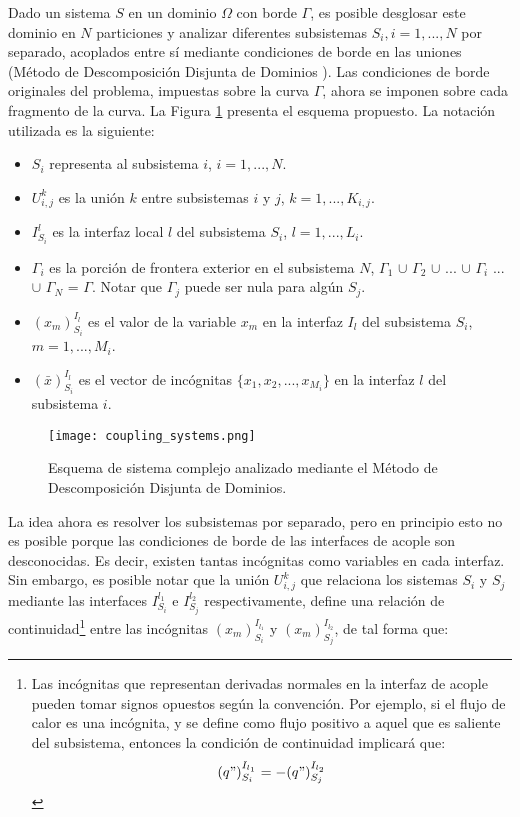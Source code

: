 Dado un sistema $S$ en un dominio $\Omega$ con borde $\Gamma$, es posible desglosar este dominio en $N$ particiones 
y analizar diferentes subsistemas $S_i,i=1,...,N$ por separado, acoplados entre sí mediante condiciones de borde en las uniones
(Método de Descomposición Disjunta de Dominios \cite{ddmethod}).
Las condiciones de borde originales del problema, impuestas sobre la curva $\Gamma$,
ahora se imponen sobre cada fragmento de la curva.
La Figura \ref{esquema-acoplamiento} presenta el esquema propuesto.
La notación utilizada es la siguiente:
\begin{itemize}
\item $S_i$ representa al subsistema $i$, $i=1,...,N$.
\item $U_{i,j}^k$ es la unión $k$ entre subsistemas $i$ y $j$, $k=1,...,K_{i,j}$.
\item $I_{S_i}^{l}$ es la interfaz local $l$ del subsistema $S_i$, $l=1,...,L_i$.
\item $\Gamma_i$ es la porción de frontera exterior en el subsistema $N$,
 $\Gamma_1$ $\cup$ $\Gamma_2$ $\cup$ ... $\cup$ $\Gamma_i$ ...  $\cup$ $\Gamma_N$ = $\Gamma$.
 Notar que $\Gamma_j$ puede ser nula para algún $S_j$.
\item ${(x_m)_{S_i}^{I_l}}$ es el valor de la variable $x_m$ en la interfaz ${I_l}$ del subsistema ${S_i}$, $m=1,...,M_i$.
\item ${(\bar{x})_{S_i}^{I_l}}$ es el vector de incógnitas $\{x_1,x_2,...,x_{M_i}\}$ en la interfaz ${l}$ del subsistema ${i}$.
\end{itemize}

\begin{figure}[ht]
\centering{}\texttt{[image: coupling\_systems.png]}
\caption[Esquema de sistema complejo analizado mediante el Método de Descomposición Disjunta de Dominios]
{Esquema de sistema complejo analizado mediante el Método de Descomposición Disjunta de Dominios.} 
\label{esquema-acoplamiento} 
\end{figure}
La idea ahora es resolver los subsistemas por separado, pero en principio esto no es posible porque las condiciones de borde de las interfaces de acople son desconocidas.
Es decir, existen tantas incógnitas como variables en cada interfaz.
Sin embargo, es posible notar que la unión $U_{i,j}^k$ que relaciona los sistemas $S_{i}$ y $S_{j}$ 
mediante las interfaces $I_{S_{i}}^{l_1}$ e $I_{S_{j}}^{l_2}$ respectivamente, 
define una relación de continuidad\footnote{
Las incógnitas que representan derivadas normales en la interfaz de acople pueden tomar signos opuestos según la convención.
Por ejemplo, si el flujo de calor es una incógnita, 
y se define como flujo positivo a aquel que es saliente del subsistema, 
entonces la condición de continuidad implicará que:
\begin{equation*}
{(q")_{S_i}^{I_{l_1}}}=-{(q")_{S_j}^{I_{l_2}}}
\label{continuidad-q}
\end{equation*}
} entre las incógnitas ${(x_m)_{S_i}^{I_{l_1}}}$ y ${(x_m)_{S_j}^{I_{l_2}}}$, de tal forma que:

